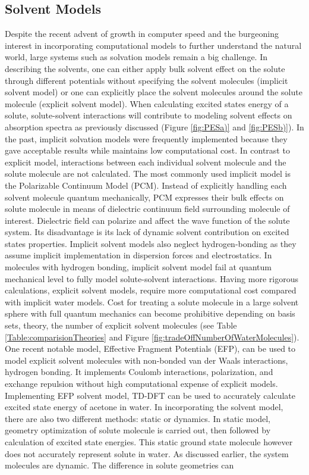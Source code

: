 \documentclass[
journal=jpcbfk, %
manuscript=article]{achemso}
\begin{document}
	\subsection{Solvent Models}
	Despite the recent advent of growth in computer speed and the burgeoning interest in incorporating computational models to further understand the natural world, large systems such as solvation models remain a big challenge.\cite{Lin2007} In describing the solvents, one can either apply bulk solvent effect on the solute through different potentials without specifying the solvent molecules (implicit solvent model) or one can explicitly place the solvent molecules around the solute molecule (explicit solvent model). When calculating excited states energy of a solute, solute-solvent interactions will contribute to modeling solvent effects on absorption spectra as previously discussed  (Figure \ref{fig:PESa)} and \ref{fig:PESb)}). In the past, implicit solvation models were frequently implemented because they gave acceptable results while maintains low computational cost. In contrast to explicit model, interactions between each individual solvent molecule and the solute molecule are not calculated. The most commonly used implicit model is the Polarizable Continuum Model (PCM).\cite{Cossi2000, Mennucci2010, Tomasi2005} Instead of explicitly handling each solvent molecule quantum mechanically, PCM expresses their bulk effects on solute molecule in means of dielectric continuum field surrounding molecule of interest. Dielectric field can polarize and affect the wave function of the solute system. Its disadvantage is its lack of dynamic solvent contribution on excited states properties.\cite{Barone2007a} Implicit solvent models also neglect hydrogen-bonding as they assume implicit implementation in dispersion forces and electrostatics.\cite{Li1999} In molecules with hydrogen bonding, implicit solvent model fail at quantum mechanical level to fully model solute-solvent interactions. Having more rigorous calculations, explicit solvent models, require more computational cost compared with implicit water models. Cost for treating a solute molecule in a large solvent sphere with full quantum mechanics can become prohibitive depending on basis sets, theory, the number of explicit solvent molecules (see Table \ref{Table:comparisionTheories} and Figure \ref{fig:tradeOffNumberOfWaterMolecules}). One recent notable model, Effective Fragment Potentials (EFP), can be used to model explicit solvent molecules with non-bonded van der Waals interactions, hydrogen bonding. It implements Coulomb interactions, polarization, and exchange repulsion without high computational expense of explicit models.\cite{Day1996,Yoo2008} Implementing EFP solvent model, TD-DFT can be used to accurately calculate excited state energy of acetone in water.\cite{Yoo2008} In incorporating the solvent model, there are also two different methods: static or dynamics. In static model, geometry optimization of solute molecule is carried out, then followed by calculation of excited state energies. This static ground state molecule however does not accurately represent solute in water.\cite{Defusco2011} As discussed earlier, the system molecules are dynamic. The difference in solute geometries can 
\end{document}
